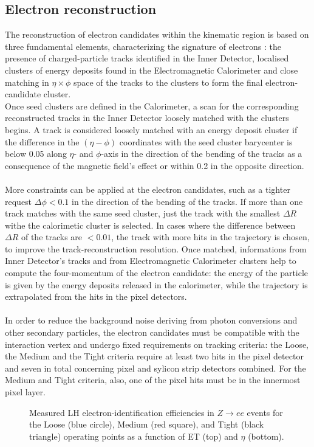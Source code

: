 \subsection{Electron reconstruction}
The reconstruction of electron candidates within the kinematic region is based on three fundamental elements, characterizing the signature of electrons \cite{Aaboud_2019ynx}: the presence of charged-particle tracks identified in the Inner Detector, localised clusters of energy deposits found in the Electromagnetic Calorimeter and close matching in $\eta \times \phi$ space of the tracks to the clusters to form the final electron-candidate cluster.
\\
Once seed clusters are defined in the Calorimeter, a scan for the corresponding reconstructed tracks in the Inner Detector loosely matched with the clusters begins. A track is considered loosely matched with an energy deposit cluster if the difference in the $(\eta - \phi)$ coordinates with the seed cluster barycenter is below 0.05 along $\eta$- and $\phi$-axis in the direction of the bending of the tracks as a consequence of the magnetic field's effect or within 0.2 in the opposite direction.
\\\\
More constraints can be applied at the electron candidates, such as a tighter request $\Delta \phi < 0.1$ in the direction of the bending of the tracks. If more than one track matches with the same seed cluster, just the track with the smallest $\Delta R$ withe the calorimetic cluster is selected. In cases where the difference between $\Delta R$ of the tracks are $<0.01$, the track with more hits in the trajectory is chosen, to improve the track-reconstruction resolution. Once matched, informations from Inner Detector's tracks and from Electromagnetic Calorimeter clusters help to compute the four-momentum of the electron candidate: the energy of the particle is given by the energy deposits released in the calorimeter, while the trajectory is extrapolated from the hits in the pixel detectors.
\\\\
In order to reduce the background noise deriving from photon conversions and other secondary particles, the electron candidates must be compatible with the interaction vertex and undergo fixed requirements on tracking criteria: the Loose, the Medium and the Tight criteria require at least two hits in the pixel detector and seven in total concerning pixel and sylicon strip detectors combined. For the Medium and Tight criteria, also, one of the pixel hits must be in the innermost pixel layer.
\begin{figure}[h]
\caption{Measured LH electron-identification efficiencies in $Z \rightarrow ee$ events for the Loose (blue circle), Medium (red square), and Tight (black triangle) operating points as a function of ET (top) and $\eta$ (bottom).}
\end{figure}

